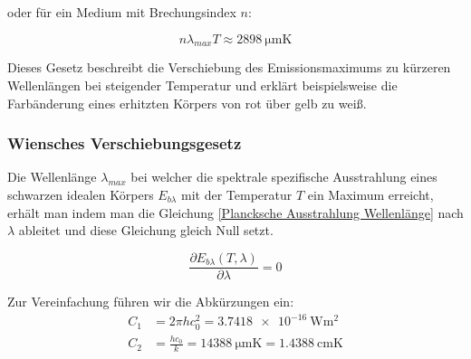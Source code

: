 \documentclass[12pt,a4paper]{article}
\begin{document}
oder für ein Medium mit Brechungsindex $n$:

\begin{equation}
  n\lambda_{max} T \approx \SI{2898}{\micro\meter\kelvin}
\end{equation}

Dieses Gesetz beschreibt die Verschiebung des Emissionsmaximums zu kürzeren Wellenlängen bei steigender Temperatur 
und erklärt beispielsweise die Farbänderung eines erhitzten Körpers von rot über gelb zu weiß.



\iffalse

Üblicherweise werden folgende Abkürzungen bei dem Plancksche'n Verschiebungsgesetz \eqref{Plancksche Ausstrahlung Wellenlänge} eingeführt:
\begin{align*}
  C_1 &= 2\pi h c_0^2 = \SI{3.7418}{\watt\meter\squared} \\
  C_2 &= \frac{hc_0}{k} = \SI{14.388}{\micro\meter\kelvin} = \SI{1.4388}{\centi\meter\kelvin}
\end{align*}

so dass die Formel \eqref{Plancksche Ausstrahlung Wellenlänge} umgestellt werden kann zu:

\begin{equation}
  \frac{E_{b\lambda}}{n^3T^5} = \frac{C_1}{(n\lambda T)^5[e^{C_2/(n\lambda T)}-1]} \quad (n = const)
\end{equation}
\fi

\fi

\subsubsection{Wiensches Verschiebungsgesetz}
Die Wellenlänge $\lambda_{max}$ bei welcher die spektrale spezifische Ausstrahlung eines schwarzen idealen Körpers $E_{b\lambda}$ 
mit der Temperatur $T$ ein Maximum erreicht, erhält man indem man die Gleichung \eqref{Plancksche Ausstrahlung Wellenlänge} nach 
$\lambda$ ableitet und diese Gleichung gleich Null setzt.

\begin{equation*}
  \frac{\partial E_{b\lambda}(T, \lambda)}{\partial \lambda} = 0
\end{equation*}

Zur Vereinfachung führen wir die Abkürzungen ein:
\begin{align*}
  C_1 &= 2\pi h c_0^2 = \SI{3.7418e-16}{\watt\meter\squared} \\
  C_2 &= \frac{hc_0}{k} = \SI{14388}{\micro\meter\kelvin} = \SI{1.4388}{\centi\meter\kelvin}
\end{align*}
\end{document}
